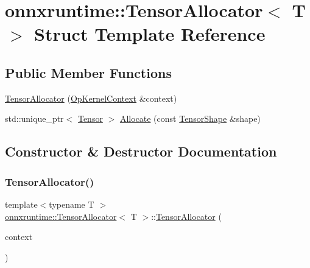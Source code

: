 \hypertarget{structonnxruntime_1_1TensorAllocator}{}\section{onnxruntime\+:\+:Tensor\+Allocator$<$ T $>$ Struct Template Reference}
\label{structonnxruntime_1_1TensorAllocator}
\subsection*{Public Member Functions}
\begin{DoxyCompactItemize}
\item 
\mbox{\hyperlink{structonnxruntime_1_1TensorAllocator_a3a057922fb018f55913297605be96211}{Tensor\+Allocator}} (\mbox{\hyperlink{classonnxruntime_1_1OpKernelContext}{Op\+Kernel\+Context}} \&context)
\item 
std\+::unique\+\_\+ptr$<$ \mbox{\hyperlink{classonnxruntime_1_1Tensor}{Tensor}} $>$ \mbox{\hyperlink{structonnxruntime_1_1TensorAllocator_aa1ba9d90a6b38db105c0dea00a682788}{Allocate}} (const \mbox{\hyperlink{classonnxruntime_1_1TensorShape}{Tensor\+Shape}} \&shape)
\end{DoxyCompactItemize}


\subsection{Constructor \& Destructor Documentation}
\mbox{\label{structonnxruntime_1_1TensorAllocator_a3a057922fb018f55913297605be96211}} 
\subsubsection{\texorpdfstring{Tensor\+Allocator()}{TensorAllocator()}}
{\footnotesize\ttfamily template$<$typename T $>$ \\
\mbox{\hyperlink{structonnxruntime_1_1TensorAllocator}{onnxruntime\+::\+Tensor\+Allocator}}$<$ T $>$\+::\mbox{\hyperlink{structonnxruntime_1_1TensorAllocator}{Tensor\+Allocator}} (\begin{DoxyParamCaption}\item[{\mbox{\hyperlink{classonnxruntime_1_1OpKernelContext}{Op\+Kernel\+Context}} \&}]{context }\end{DoxyParamCaption})\hspace{0.3cm}{\ttfamily [inline]}}



